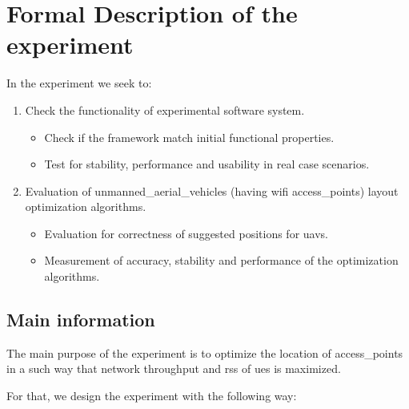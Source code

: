 \section{Formal Description of the
experiment}\label{formal-description-of-the-experiment}

In the experiment we seek to:

\begin{enumerate}
\def\labelenumi{\arabic{enumi}.}
\tightlist
\item
  Check the functionality of experimental software system.
  
  \begin{itemize}
  	\tightlist
  	\item
  	Check if the framework match initial functional properties.
  	\item
  	Test for stability, performance and usability in real case scenarios.
  \end{itemize}

\item
  Evaluation of \glspl{unmanned_aerial_vehicle} (having \gls{wifi} \glspl{access_point}) layout optimization algorithms.
  
  \begin{itemize}
  	\tightlist
  	\item
  	Evaluation for correctness of suggested positions for \glspl{uav}.
  	\item
  	Measurement of accuracy, stability and performance of the	optimization algorithms.
  \end{itemize}
  
\end{enumerate}


\subsection{Main information}\label{main-information}

The main purpose of the experiment is to optimize the location of \glspl{access_point} in a such way that network throughput and \acrshort{rss} of \glspl{ue} is maximized.

For that, we design the experiment with the following way:

